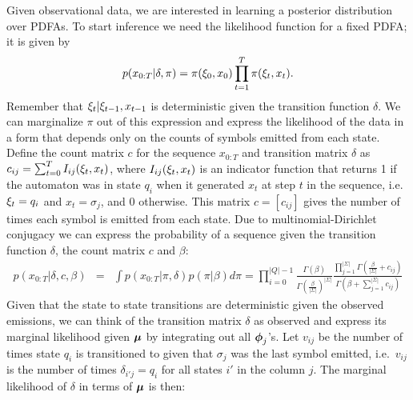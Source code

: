 Given observational data, we are interested in learning a posterior distribution over PDFAs.  To start inference we need the likelihood function for a fixed PDFA; it is given by
%
\[ p(x_{0:T}|\delta,\pi) = \pi(\q_0,x_0)\prod_{t=1}^T \pi(\q_t,x_t) \label{x:def}. \]
%
Remember that $\q_t | \q_{t-1}, x_{t-1}$ is deterministic given the transition function $\delta$. 
We can marginalize $\pi$ out of this expression and express the likelihood of the data in a form that depends only on the counts of symbols emitted from each state.  Define the count matrix $c$ for the sequence $x_{0:T}$ and transition matrix $\delta$ as $c_{ij} = \sum_{t=0}^T I_{ij}(\q_t,x_t)$, where $I_{ij}(\q_t,x_t)$ is an indicator function that returns 1 if the automaton was in state $q_i$ when it generated $x_t$ at step $t$ in the sequence, i.e. $\q_t = q_i$ and $x_t = \sigma_j$, and 0 otherwise. This matrix $c = [c_{ij}]$ gives the number of times each symbol is emitted from each state.  Due to multinomial-Dirichlet conjugacy we can express the probability of a sequence given the transition function $\delta$, the count matrix $c$ and $\beta$:
%
\begin{eqnarray}
 p(x_{0:T}|\delta,c,\beta) & = & \int p(x_{0:T}|\pi,\delta) p(\pi|\beta) d\pi \label{x:factor} %
= \prod_{i=0}^{|Q|-1} \frac{\Gamma(\beta)}{\Gamma(\frac{\beta}{|\Sigma|})^{|\Sigma|}} \frac{\prod_{j=1}^{|\Sigma|}\Gamma(\frac{\beta}{|\Sigma|} + c_{ij})}{\Gamma(\beta + \sum_{j=1}^{|\Sigma|} c_{ij})} \label{x:end}
 \end{eqnarray}
 Given that the state to state transitions are deterministic given the observed emissions, we can think of the transition matrix $\delta$ as observed and express its marginal likelihood given $\bmu$ by integrating out all $\bphi_j$'s.  Let $v_{ij}$ be the number of times state $q_i$ is transitioned to given that $\sigma_j$ was the last symbol emitted, i.e.~$v_{ij}$ is the number of times $\delta_{i'j} = q_i$ for all states $i'$ in the column $j$. %
The marginal likelihood of $\delta$ in terms of $\bmu$ is then:
